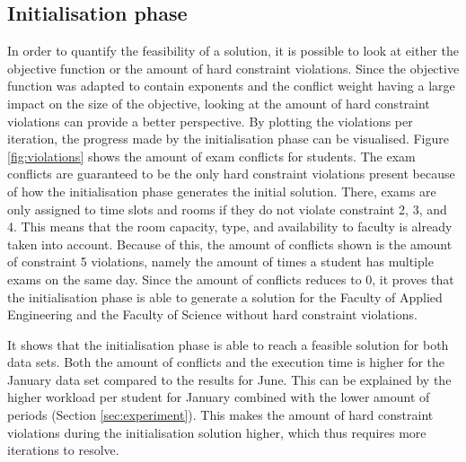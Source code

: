 \subsection{Initialisation phase} \label{phase_init}

In order to quantify the feasibility of a solution, it is possible to look at either the objective function or the amount of hard constraint violations. Since the objective function was adapted to contain exponents and the conflict weight having a large impact on the size of the objective, looking at the amount of hard constraint violations can provide a better perspective. By plotting the violations per iteration, the progress made by the initialisation phase can be visualised. Figure \ref{fig:violations} shows the amount of exam conflicts for students. The exam conflicts are guaranteed to be the only hard constraint violations present because of how the initialisation phase generates the initial solution. There, exams are only assigned to time slots and rooms if they do not violate constraint 2, 3, and 4. This means that the room capacity, type, and availability to faculty is already taken into account. Because of this, the amount of conflicts shown is the amount of constraint 5 violations, namely the amount of times a student has multiple exams on the same day. Since the amount of conflicts reduces to 0, it proves that the initialisation phase is able to generate a solution for the Faculty of Applied Engineering and the Faculty of Science without hard constraint violations. 

It shows that the initialisation phase is able to reach a feasible solution for both data sets. Both the amount of conflicts and the execution time is higher for the January data set compared to the results for June. This can be explained by the higher workload per student for January combined with the lower amount of periods (Section \ref{sec:experiment}). This makes the amount of hard constraint violations during the initialisation solution higher, which thus requires more iterations to resolve.

